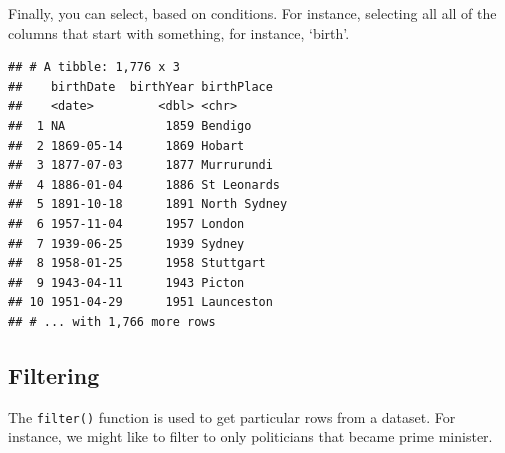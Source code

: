 \documentclass[
]{book}
\newenvironment{Shaded}{\begin{snugshade}}{\end{snugshade}}
\newcommand{\DecValTok}[1]{\textcolor[rgb]{0.00,0.00,0.81}{#1}}
\newcommand{\KeywordTok}[1]{\textcolor[rgb]{0.13,0.29,0.53}{\textbf{#1}}}
\newcommand{\NormalTok}[1]{#1}
\newcommand{\OperatorTok}[1]{\textcolor[rgb]{0.81,0.36,0.00}{\textbf{#1}}}
\newcommand{\StringTok}[1]{\textcolor[rgb]{0.31,0.60,0.02}{#1}}
\begin{document}
Finally, you can select, based on conditions. For instance, selecting all all of the columns that start with something, for instance, `birth'.

\begin{Shaded}
\end{Shaded}

\begin{verbatim}
## # A tibble: 1,776 x 3
##    birthDate  birthYear birthPlace  
##    <date>         <dbl> <chr>       
##  1 NA              1859 Bendigo     
##  2 1869-05-14      1869 Hobart      
##  3 1877-07-03      1877 Murrurundi  
##  4 1886-01-04      1886 St Leonards 
##  5 1891-10-18      1891 North Sydney
##  6 1957-11-04      1957 London      
##  7 1939-06-25      1939 Sydney      
##  8 1958-01-25      1958 Stuttgart   
##  9 1943-04-11      1943 Picton      
## 10 1951-04-29      1951 Launceston  
## # ... with 1,766 more rows
\end{verbatim}

\hypertarget{filtering}{%
\subsection{Filtering}\label{filtering}}

The \texttt{filter()} function is used to get particular rows from a dataset. For instance, we might like to filter to only politicians that became prime minister.

\begin{Shaded}
\end{Shaded}
\end{document}
